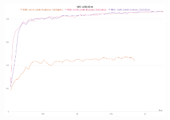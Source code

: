         
        \begin{figure}[h]
       \caption{IoU for binary lane segmentation trained on sim3D dataset with cross entropy, dice and focal loss.}
        \centering
        \begin{subfigure}{0.6\textwidth}
        \includegraphics[width=1\linewidth, height=5cm]{images/IOU_full.png} 
        \label{fig:subim1}
        \end{subfigure}
        \end{figure}
        
